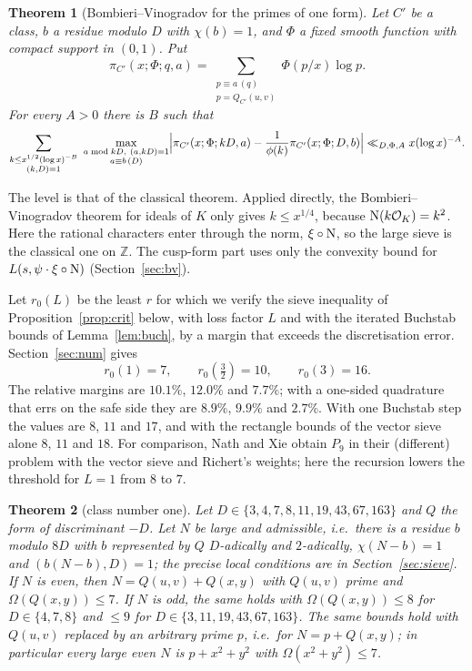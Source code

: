 \documentclass[11pt]{amsart}
\newtheorem{theorem}{Theorem}[section]
\theoremstyle{remark}
\newcommand{\Z}{\mathbb Z}
\begin{document}
\begin{theorem}[Bombieri--Vinogradov for the primes of one form]\label{thm:bv}
Let $C'$ be a class, $b$ a residue modulo $D$ with $\chi(b)=1$, and $\Phi$ a fixed smooth function with compact support in $(0,1)$. Put
\[
\pi_{C'}(x;\Phi;q,a)=\sum_{\substack{p\equiv a\,(q)\\ p=Q_{C'}(u,v)}}\Phi(p/x)\log p .
\]
For every $A>0$ there is $B$ such that
\[
\sum_{\substack{k\le x^{1/2}(\log x)^{-B}\\ (k,D)=1}}\ \max_{\substack{a\bmod kD,\ (a,kD)=1\\ a\equiv b\,(D)}}\Bigl|\pi_{C'}(x;\Phi;kD,a)-\frac1{\phi(k)}\pi_{C'}(x;\Phi;D,b)\Bigr|\ll_{D,\Phi,A}x(\log x)^{-A}.
\]
\end{theorem}
The level is that of the classical theorem. Applied directly, the Bombieri--Vinogradov theorem for ideals of $K$ \cite{Huxley,Wilson} only gives $k\le x^{1/4}$, because ${\rm N}(k\mathcal O_K)=k^2$. Here the rational characters enter through the norm, $\xi\circ{\rm N}$, so the large sieve is the classical one on $\Z$. The cusp-form part uses only the convexity bound for $L(s,\psi\cdot\xi\circ{\rm N})$ (Section~\ref{sec:bv}).

Let $r_0(L)$ be the least $r$ for which we verify the sieve inequality of Proposition~\ref{prop:crit} below, with loss factor $L$ and with the iterated Buchstab bounds of Lemma~\ref{lem:buch}, by a margin that exceeds the discretisation error. Section~\ref{sec:num} gives
\[
r_0(1)=7,\qquad r_0(\tfrac32)=10,\qquad r_0(3)=16 .
\]
The relative margins are $10.1\%$, $12.0\%$ and $7.7\%$; with a one-sided quadrature that errs on the safe side they are $8.9\%$, $9.9\%$ and $2.7\%$. With one Buchstab step the values are $8$, $11$ and $17$, and with the rectangle bounds of the vector sieve alone $8$, $11$ and $18$. For comparison, Nath and Xie \cite{NX} obtain $P_9$ in their (different) problem with the vector sieve and Richert's weights; here the recursion lowers the threshold for $L=1$ from $8$ to $7$.

\begin{theorem}[class number one]\label{thm:h1}
Let $D\in\{3,4,7,8,11,19,43,67,163\}$ and $Q$ the form of discriminant $-D$. Let $N$ be large and \emph{admissible}, i.e.\ there is a residue $b$ modulo $8D$ with $b$ represented by $Q$ $D$-adically and $2$-adically, $\chi(N-b)=1$ and $(b(N-b),D)=1$; the precise local conditions are in Section~\ref{sec:sieve}. If $N$ is even, then $N=Q(u,v)+Q(x,y)$ with $Q(u,v)$ prime and $\Omega(Q(x,y))\le7$. If $N$ is odd, the same holds with $\Omega(Q(x,y))\le8$ for $D\in\{4,7,8\}$ and $\le9$ for $D\in\{3,11,19,43,67,163\}$. The same bounds hold with $Q(u,v)$ replaced by an arbitrary prime $p$, i.e.\ for $N=p+Q(x,y)$; in particular every large even $N$ is $p+x^2+y^2$ with $\Omega(x^2+y^2)\le7$.
\end{theorem}
\end{document}
